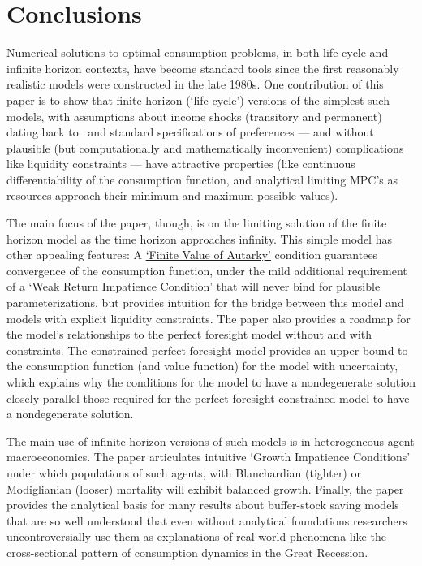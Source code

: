 \documentclass[BufferStockTheory]{subfiles}
\begin{document}
\hypertarget{Conclusions}{}
\section{Conclusions}

Numerical solutions to optimal consumption problems, in both life cycle and infinite horizon contexts, have become standard tools since the first reasonably realistic models were constructed in the late 1980s. One contribution of this paper is to show that finite horizon (`life cycle') versions of the simplest such models, with assumptions about income shocks (transitory and permanent) dating back to~\cite{friedmanATheory} and standard specifications of preferences --- and without plausible (but computationally and mathematically inconvenient) complications like liquidity constraints --- have attractive properties (like continuous differentiability of the consumption function, and analytical limiting MPC's as resources approach their minimum and maximum possible values).%

The main focus of the paper, though, is on the limiting solution of the finite horizon model as the time horizon approaches infinity.  This simple model has other appealing features: A \hyperlink{FVAC}{`Finite Value of Autarky'} condition guarantees convergence of the consumption function, under the mild additional requirement of a \hyperlink{WRIC}{`Weak Return Impatience Condition'} that will never bind for plausible parameterizations, but provides intuition for the bridge between this model and models with explicit liquidity constraints. The paper also provides a roadmap for the model's relationships to the perfect foresight model without and with constraints.  The constrained perfect foresight model provides an upper bound to the consumption function (and value function) for the model with uncertainty, which explains why the conditions for the model to have a nondegenerate solution closely parallel those required for the perfect foresight constrained model to have a nondegenerate solution.

The main use of infinite horizon versions of such models is in heterogeneous-agent macroeconomics. The paper articulates intuitive `Growth Impatience Conditions' under which populations of such agents, with Blanchardian (tighter) or Modiglianian (looser) mortality will exhibit balanced growth.  Finally, the paper provides the analytical basis for many results about buffer-stock saving models that are so well understood that even without analytical foundations researchers uncontroversially use them as explanations of real-world phenomena like the cross-sectional pattern of consumption dynamics in the Great Recession.
\end{document}
